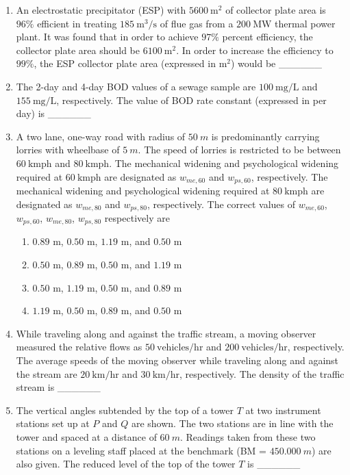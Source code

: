 \documentclass[journal]{IEEEtran}
\begin{document}
\begin{enumerate}[resume]
\item An electrostatic precipitator (ESP) with $5600 \ \text{m}^2$ of collector plate area is $96 \%$ efficient in treating $185 \ \text{m}^3/\text{s}$ of flue gas from a $200 \ \text{MW}$ thermal power plant. It was found that in order to achieve $97 \%$ percent efficiency, the collector plate area should be $6100 \ \text{m}^2$. In order to increase the efficiency to $99 \%$, the ESP collector plate area (expressed in $\text{m}^2$) would be \_\_\_\_\_\_ \hfill {}

\item The 2-day and 4-day BOD values of a sewage sample are $100 \ \text{mg/L}$ and $155 \ \text{mg/L}$, respectively. The value of BOD rate constant (expressed in per day) is \_\_\_\_\_\_ \hfill {}

\item A two lane, one-way road with radius of $50 \ m$ is predominantly carrying lorries with wheelbase of $5 \ m$. The speed of lorries is restricted to be between $60 \ \text{kmph}$ and $80 \ \text{kmph}$. The mechanical widening and psychological widening required at $60 \ \text{kmph}$ are designated as $w_{me,60}$ and $w_{ps,60}$, respectively. The mechanical widening and psychological widening required at $80 \ \text{kmph}$ are designated as $w_{me,80}$ and $w_{ps,80}$, respectively. The correct values of $w_{me,60}$, $w_{ps,60}$, $w_{me,80}$, $w_{ps,80}$ respectively are  \hfill {}
\begin{enumerate}
    \item $0.89$ m, $0.50$ m, $1.19$ m, and $0.50$ m
    \item $0.50$ m, $0.89$ m, $0.50$ m, and $1.19$ m
    \item $0.50$ m, $1.19$ m, $0.50$ m, and $0.89$ m
    \item $1.19$ m, $0.50$ m, $0.89$ m, and $0.50$ m
\end{enumerate}

\item While traveling along and against the traffic stream, a moving observer measured the relative flows as $50 \ \text{vehicles/hr}$ and $200 \ \text{vehicles/hr}$, respectively. The average speeds of the moving observer while traveling along and against the stream are $20 \ \text{km/hr}$ and $30 \ \text{km/hr}$, respectively. The density of the traffic stream  is \_\_\_\_\_\_ \hfill {}

\item The vertical angles subtended by the top of a tower $T$ at two instrument stations set up at $P$ and $Q$ are shown. The two stations are in line with the tower and spaced at a distance of $60 \ m$. Readings taken from these two stations on a leveling staff placed at the benchmark (BM = $450.000 \ m$) are also given. The reduced level of the top of the tower $T$  is \_\_\_\_\_\_ \hfill {}


\end{enumerate}
\end{document}
